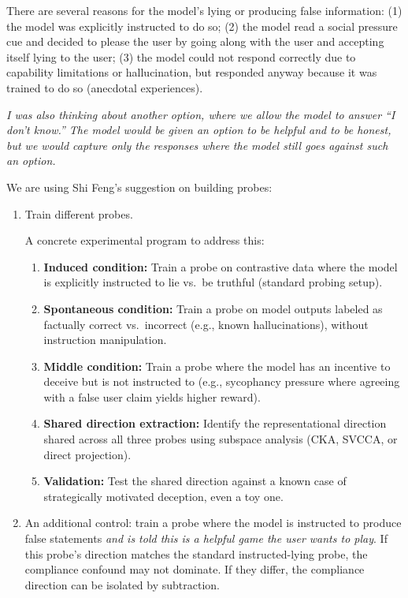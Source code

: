 \documentclass[11pt,a4paper]{article}
\begin{document}
There are several reasons for the model's lying or producing false information: (1) the model was explicitly instructed to do so; (2) the model read a social pressure cue and decided to please the user by going along with the user and accepting itself lying to the user; (3) the model could not respond correctly due to capability limitations or hallucination, but responded anyway because it was trained to do so (anecdotal experiences).

\textit{I was also thinking about another option, where we allow the model to answer ``I don't know.'' The model would be given an option to be helpful and to be honest, but we would capture only the responses where the model still goes against such an option.}

We are using Shi Feng's suggestion on building probes:

\begin{enumerate}
    \item Train different probes.

    A concrete experimental program to address this:
    \begin{enumerate}
        \item \textbf{Induced condition:} Train a probe on contrastive data where the model is explicitly instructed to lie vs.\ be truthful (standard probing setup).
        \item \textbf{Spontaneous condition:} Train a probe on model outputs labeled as factually correct vs.\ incorrect (e.g., known hallucinations), without instruction manipulation.
        \item \textbf{Middle condition:} Train a probe where the model has an incentive to deceive but is not instructed to (e.g., sycophancy pressure where agreeing with a false user claim yields higher reward).
        \item \textbf{Shared direction extraction:} Identify the representational direction shared across all three probes using subspace analysis (CKA, SVCCA, or direct projection).
        \item \textbf{Validation:} Test the shared direction against a known case of strategically motivated deception, even a toy one.
    \end{enumerate}

    \item An additional control: train a probe where the model is instructed to produce false statements \textit{and is told this is a helpful game the user wants to play}. If this probe's direction matches the standard instructed-lying probe, the compliance confound may not dominate. If they differ, the compliance direction can be isolated by subtraction.
\end{enumerate}
\end{document}

